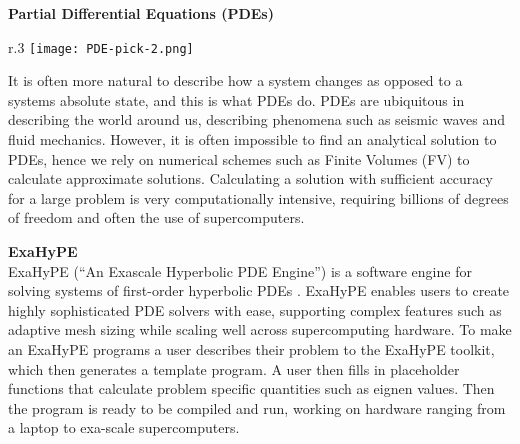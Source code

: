 \textbf{Partial Differential Equations (PDEs)}\\
\begin{wrapfigure}{r}{.3\textwidth}
        \texttt{[image: PDE-pick-2.png]}
\end{wrapfigure}
It is often more natural to describe how a system changes as opposed to a systems absolute state, and this is what PDEs do.
PDEs are ubiquitous in describing the world around us, describing 
phenomena such as seismic waves and fluid mechanics.
However, it is often impossible to find an analytical solution to PDEs, hence we rely 
on numerical schemes such as Finite Volumes (FV) to calculate approximate 
solutions.
Calculating a solution with sufficient accuracy for a large problem is very computationally intensive, requiring billions of degrees of freedom and often the use of supercomputers.

\phantom{ }

\textbf{ExaHyPE}\\
ExaHyPE (``An Exascale Hyperbolic PDE Engine'') is a software engine for solving systems of first-order hyperbolic PDEs \cite{exahype}.
ExaHyPE enables users to create highly sophisticated PDE solvers with ease, 
supporting complex features such as adaptive mesh sizing while scaling well across 
supercomputing hardware.
To make an ExaHyPE programs a user describes their problem to the ExaHyPE toolkit, which then generates a template program.
A user then fills in placeholder functions that calculate problem specific quantities such as eignen values.
Then the program is ready to be compiled and run, working on hardware ranging from a laptop to exa-scale supercomputers.



